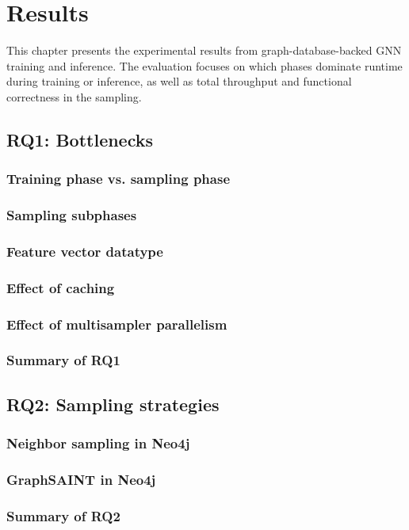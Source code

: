 \documentclass[PhD,single]{uclathes}
\begin{document}
\chapter{Results}

This chapter presents the experimental results from graph-database-backed GNN
training and inference. The evaluation focuses on which phases dominate runtime
during training or inference, as well as total throughput and functional
correctness in the sampling.

\section{RQ1: Bottlenecks}
\subsection{Training phase vs. sampling phase}
\subsection{Sampling subphases}
\subsection{Feature vector datatype}
\subsection{Effect of caching}
\subsection{Effect of multisampler parallelism}
\subsection{Summary of RQ1}

\section{RQ2: Sampling strategies}
\subsection{Neighbor sampling in Neo4j}
\subsection{GraphSAINT in Neo4j}
\subsection{Summary of RQ2}
\end{document}
